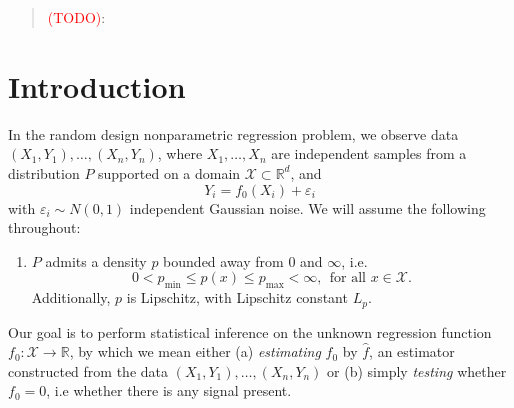 \documentclass[twoside]{article}
\newcommand{\Reals}{\mathbb{R}}
\newcommand{\1}{\mathbf{1}}
\newcommand{\Xset}{\mathcal{X}}
\newcommand{\wh}[1]{\widehat{#1}}
\theoremstyle{definition}
\theoremstyle{remark}
\begin{document}
	
	

\begin{abstract}
	\textcolor{red}{(TODO)}:
\end{abstract}

\section{Introduction}

In the random design nonparametric regression problem, we observe data $(X_1,Y_1),\ldots,(X_n,Y_n)$, where $X_1,\ldots,X_n$ are independent samples from a distribution $P$ supported on a domain $\Xset \subset \Reals^d$, and 
\begin{equation}
\label{eqn:random_design_regression}
Y_i = f_0(X_i) + \varepsilon_i
\end{equation}
with $\varepsilon_i \sim N(0,1)$ independent Gaussian noise. We will assume the following throughout:
\begin{enumerate}[label=(P\arabic*)]
	\item
	\label{asmp:bounded_lipschitz_density} 
	$P$ admits a density $p$ bounded away from $0$ and $\infty$, i.e.
	\begin{equation*}
	0 < p_{\min} \leq p(x) \leq p_{\max} < \infty,~~\textrm{for all $x \in \Xset$.}
	\end{equation*}
	Additionally, $p$ is Lipschitz, with Lipschitz constant $L_p$.
\end{enumerate}
Our goal is to perform statistical inference on the unknown regression function $f_0: \Xset \to \Reals$, by which we mean either (a) \emph{estimating} $f_0$ by $\wh{f}$, an estimator constructed from the data $(X_1,Y_1),\ldots,(X_n,Y_n)$ or (b) simply \emph{testing} whether $f_0 = 0$, i.e whether there is any signal present. 
\end{document}
